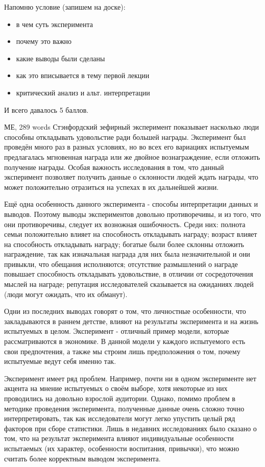 \documentclass{beamer}
\begin{document}
\begin{frame}
Напомню условие (запишем на доске): 
\begin{itemize}
  \item в чем суть эксперимента
  \item почему это важно
  \item какие выводы были сделаны
  \item как это вписывается в тему первой лекции
  \item критический анализ и альт. интерпретации
\end{itemize}
И всего давалось 5 баллов.
\end{frame}

\begin{frame}{МЕ, 289 words}
\tiny
Стэнфордский зефирный эксперимент показывает насколько люди способны откладывать удовольстие ради большей награды. Эксперимент был проведён много раз в разных условиях, но во всех его вариациях \alert{испытуемым предлагалась мгновенная награда или же двойное вознаграждение, если отложить получение награды}. Особая важность исследования в том, что данный эксперимент позволяет получить данные о склонности людей ждать награды, что может положительно отразиться на успехах в их дальнейшей жизни. 
    
    Ещё одна особенность данного эксперимента - способы интерпретации данных и выводов. \alert{Поэтому выводы экспериментов довольно противоречивы, и из того, что они противоречивы, следует их возножная ошибочность}. Среди них: полнота семьи положительно влияет на способность откладывать награду; возраст влияет на способность откладывать награду; богатые были более склонны отложить награждение, так как изначальная награда для них была незначительной и они привыкли, что обещания исполняются; отсутствие размышлений о награде повышает способность откладывать удовольствие, в отличии от  сосредоточения мыслей на награде; репутация исследователей сказывается на ожиданиях людей (люди могут ожидать, что их обманут).
    
    Одни из последних выводах говорят о том, что \alert{личностные особенности, что закладываются в раннем детстве, влияют на результаты эксперимента и на жизнь испытуемых в целом}. Эксперимент -  отличный пример модели, которые рассматриваются в экономике. \alert{В данной модели у каждого испытуемого есть свои предпочтения}, а также мы строим лишь предположения о том, почему испытуемые ведут себя именно так.
    
    Эксперимент имеет ряд проблем. Например, почти ни в одном эксперименте нет акцента на мнение испытуемых о своём выборе, хотя некоторые из них проводились на довольно взрослой аудитории. Однако, помимо проблем в методике проведения эксперимента, полученные данные очень сложно точно интерпретировать, так как исследователи могут легко упустить целый ряд факторов при сборе статистики. Лишь в недавних исследованиях было сказано о том, что на результат эксперимента влияют индивидуальные особенности испытаемых (их характер, особенности воспитания, привычки), что можно считать более корректным выводом эксперимента. 
\end{frame}
\end{document}
